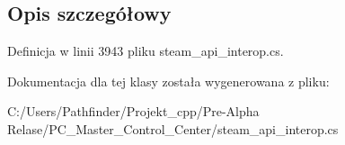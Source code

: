 \subsection{Opis szczegółowy}


Definicja w linii 3943 pliku steam\+\_\+api\+\_\+interop.\+cs.



Dokumentacja dla tej klasy została wygenerowana z pliku\+:\begin{DoxyCompactItemize}
\item 
C\+:/\+Users/\+Pathfinder/\+Projekt\+\_\+cpp/\+Pre-\/\+Alpha Relase/\+P\+C\+\_\+\+Master\+\_\+\+Control\+\_\+\+Center/steam\+\_\+api\+\_\+interop.\+cs\end{DoxyCompactItemize}
